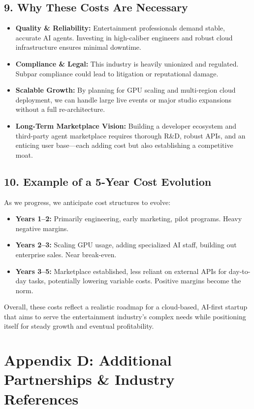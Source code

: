 \documentclass[11pt]{article}
\begin{document}
\subsection{9. Why These Costs Are Necessary}
\begin{itemize}
    \item \textbf{Quality \& Reliability:} Entertainment professionals demand stable, accurate AI agents. Investing in high-caliber engineers and robust cloud infrastructure ensures minimal downtime.
    \item \textbf{Compliance \& Legal:} This industry is heavily unionized and regulated. Subpar compliance could lead to litigation or reputational damage.
    \item \textbf{Scalable Growth:} By planning for GPU scaling and multi-region cloud deployment, we can handle large live events or major studio expansions without a full re-architecture.
    \item \textbf{Long-Term Marketplace Vision:} Building a developer ecosystem and third-party agent marketplace requires thorough R\&D, robust APIs, and an enticing user base—each adding cost but also establishing a competitive moat.
\end{itemize}

\subsection{10. Example of a 5-Year Cost Evolution}
As we progress, we anticipate cost structures to evolve:
\begin{itemize}
    \item \textbf{Years 1--2:} Primarily engineering, early marketing, pilot programs. Heavy negative margins.
    \item \textbf{Years 2--3:} Scaling GPU usage, adding specialized AI staff, building out enterprise sales. Near break-even.
    \item \textbf{Years 3--5:} Marketplace established, less reliant on external APIs for day-to-day tasks, potentially lowering variable costs. Positive margins become the norm.
\end{itemize}

\noindent Overall, these costs reflect a realistic roadmap for a cloud-based, AI-first startup that aims to serve the entertainment industry's complex needs while positioning itself for steady growth and eventual profitability.


\clearpage
\section{Appendix D: Additional Partnerships \& Industry References}
\label{appendix:extended-partnerships}
\end{document}
